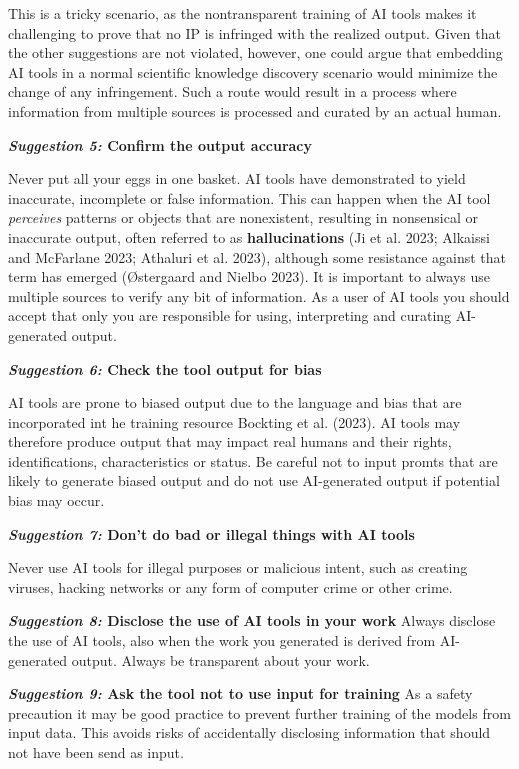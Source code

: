 \documentclass[
  letterpaper,
  DIV=11,
  numbers=noendperiod]{scrreprt}
\begin{document}
This is a tricky scenario, as the nontransparent training of AI tools
makes it challenging to prove that no IP is infringed with the realized
output. Given that the other suggestions are not violated, however, one
could argue that embedding AI tools in a normal scientific knowledge
discovery scenario would minimize the change of any infringement. Such a
route would result in a process where information from multiple sources
is processed and curated by an actual human.

\textbf{\emph{Suggestion 5:} Confirm the output accuracy}

Never put all your eggs in one basket. AI tools have demonstrated to
yield inaccurate, incomplete or false information. This can happen when
the AI tool \emph{perceives} patterns or objects that are nonexistent,
resulting in nonsensical or inaccurate output, often referred to as
\textbf{hallucinations} (Ji et al. 2023; Alkaissi and McFarlane 2023;
Athaluri et al. 2023), although some resistance against that term has
emerged (Østergaard and Nielbo 2023). It is important to always use
multiple sources to verify any bit of information. As a user of AI tools
you should accept that only you are responsible for using, interpreting
and curating AI-generated output.

\textbf{\emph{Suggestion 6:} Check the tool output for bias}

AI tools are prone to biased output due to the language and bias that
are incorporated int he training resource Bockting et al. (2023). AI
tools may therefore produce output that may impact real humans and their
rights, identifications, characteristics or status. Be careful not to
input promts that are likely to generate biased output and do not use
AI-generated output if potential bias may occur.

\textbf{\emph{Suggestion 7:} Don't do bad or illegal things with AI
tools}

Never use AI tools for illegal purposes or malicious intent, such as
creating viruses, hacking networks or any form of computer crime or
other crime.

\textbf{\emph{Suggestion 8:} Disclose the use of AI tools in your work}
Always disclose the use of AI tools, also when the work you generated is
derived from AI-generated output. Always be transparent about your work.

\textbf{\emph{Suggestion 9:} Ask the tool not to use input for training}
As a safety precaution it may be good practice to prevent further
training of the models from input data. This avoids risks of
accidentally disclosing information that should not have been send as
input.
\end{document}
